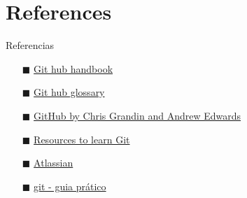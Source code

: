 \documentclass[xcolor=dvipsnames,t]{beamer}
\begin{document}
\section{References}
\begin{frame}{Referencias}

	\begin{itemize}		
	\item[$\blacksquare$] \href{https://guides.github.com/introduction/git-handbook/}{\color{blue}Git hub handbook}
	\item[$\blacksquare$] \href{https://help.github.com/articles/github-glossary/}{\color{blue} Git hub glossary}
	\item[$\blacksquare$] \href{https://github.com/pbs-assess/git-course}{\color{blue} GitHub by Chris Grandin and Andrew Edwards}
	\item[$\blacksquare$] \href{https://try.github.io/}{\color{blue} Resources to learn Git}
	\item[$\blacksquare$] \href{https://www.atlassian.com/git}{\color{blue} Atlassian} 			
	\item[$\blacksquare$]  \href{http://rogerdudler.github.io/git-guide/index.pt_BR.html}{\color{blue} git - guia prático} 			
	\end{itemize}
	
%	
\end{frame}
\end{document}
